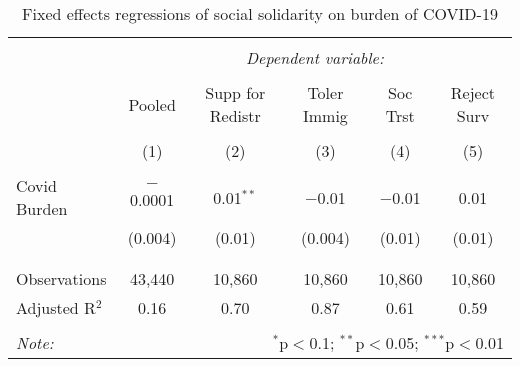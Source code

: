 
\begin{table}[!htbp] \centering 
  \caption{Fixed effects regressions of social solidarity on burden of COVID-19} 
  \label{tab:soc_cbs} 
\begin{tabular}{@{\extracolsep{5pt}}lccccc} 
\\[-1.8ex]\hline 
\hline \\[-1.8ex] 
 & \multicolumn{5}{c}{\textit{Dependent variable:}} \\ 
\cline{2-6} 
\\[-1.8ex] & Pooled & Supp for Redistr & Toler Immig & Soc Trst & Reject Surv \\ 
\\[-1.8ex] & (1) & (2) & (3) & (4) & (5)\\ 
\hline \\[-1.8ex] 
 Covid Burden & $-$0.0001 & 0.01$^{**}$ & $-$0.01 & $-$0.01 & 0.01 \\ 
  & (0.004) & (0.01) & (0.004) & (0.01) & (0.01) \\ 
  & & & & & \\ 
\hline \\[-1.8ex] 
Observations & 43,440 & 10,860 & 10,860 & 10,860 & 10,860 \\ 
Adjusted R$^{2}$ & 0.16 & 0.70 & 0.87 & 0.61 & 0.59 \\ 
\hline 
\hline \\[-1.8ex] 
\textit{Note:}  & \multicolumn{5}{r}{$^{*}$p$<$0.1; $^{**}$p$<$0.05; $^{***}$p$<$0.01} \\ 
\end{tabular} 
\end{table} 
